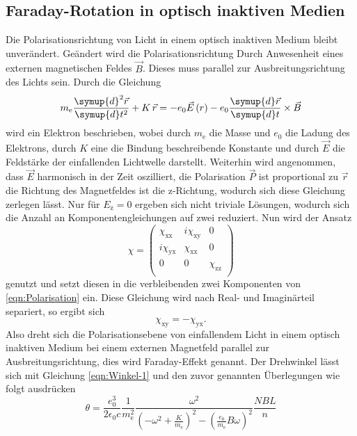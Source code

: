 \documentclass[
  bibliography=totoc,     %
  captions=tableheading,  %
  titlepage=firstiscover, %
]{scrartcl}
\begin{document}
\subsection{Faraday-Rotation in optisch inaktiven Medien}
\label{sec:Theo22}
Die Polarisationsrichtung von Licht in einem optisch inaktiven Medium bleibt unverändert.
Geändert wird die Polarisationsrichtung Durch Anwesenheit eines externen magnetischen Feldes $\vec{B}$.
Dieses muss parallel zur Ausbreitungsrichtung des Lichts sein.
Durch die Gleichung
\begin{equation*}
  m_\text{e} \frac{\symup{d}^2 \vec{r}}{\symup{d} t^2} + K \, \vec{r} =
  - e_0 \vec{E}\left(r\right)
  - e_0 \frac{\symup{d} \vec{r}}{\symup{d} t} \times \vec{B}
\end{equation*}
wird ein Elektron beschrieben, wobei durch $m_\text{e}$ die Masse und $e_0$ die Ladung des Elektrons,
durch $K$ eine die Bindung beschreibende Konstante und durch
$\vec{E}$ die Feldstärke der einfallenden Lichtwelle darstellt.
Weiterhin wird angenommen, dass $\vec{E}$ harmonisch in der Zeit
oszilliert, die Polarisation $\vec{P}$ ist proportional zu $\vec{r}$
die Richtung des Magnetfeldes ist die z-Richtung, wodurch sich diese Gleichung
zerlegen lässt.
Nur für $E_\text{z} = 0$ ergeben sich nicht triviale Lösungen, wodurch sich die
Anzahl an Komponentengleichungen auf zwei reduziert.
Nun wird der Ansatz
\begin{equation*}
  \chi =
  \begin{pmatrix}
    \chi_\text{xx} & i \chi_\text{xy} & 0 \\
    i \chi_\text{yx} & \chi_\text{xx} & 0 \\
    0 & 0 & \chi_\text{zz} \\
  \end{pmatrix}
\end{equation*}
genutzt und setzt diesen in die verbleibenden zwei Komponenten von \eqref{eqn:Polarisation} ein.
Diese Gleichung wird nach Real- und Imaginärteil separiert, so ergibt sich
\begin{equation*}
  \chi_\text{xy} = - \chi_\text{yx}.
\end{equation*}
Also dreht sich die Polarisationsebene von einfallendem Licht in einem
optisch inaktiven Medium bei einem externen Magnetfeld parallel zur
Ausbreitungsrichtung, dies wird Faraday-Effekt genannt.
Der Drehwinkel lässt sich mit Gleichung \eqref{eqn:Winkel-1} und den zuvor genannten Überlegungen
wie folgt ausdrücken
\begin{equation*}
  \theta = \frac{e_0^3}{2 \epsilon_0 c}\frac{1}{m_\text{e}^2}
  \frac{\omega^2}{\left(-\omega^2 + \frac{K}{m_\text{e}}\right)^2 -
  \left(\frac{e_0}{m_\text{e}} B \omega\right)^2}
  \frac{N B L}{n}
\end{equation*}
\end{document}
